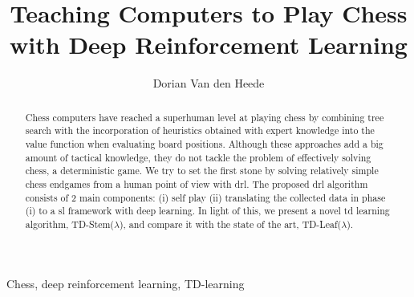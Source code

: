 \documentclass[twocolumn]{phdsymp} %
\begin{document}
\title{Teaching Computers to Play Chess with Deep Reinforcement Learning} %

\author{Dorian Van den Heede}


\maketitle

\begin{abstract}
Chess computers have reached a superhuman level at playing chess by combining tree search with the incorporation of heuristics obtained with expert knowledge into the value function when evaluating board positions. Although these approaches add a big amount of tactical knowledge, they do not tackle the problem of effectively solving chess, a deterministic game. We try to set the first stone by solving relatively simple chess endgames from a human point of view with \gls{drl}. The proposed \gls{drl} algorithm consists of 2 main components: (i) self play (ii) translating the collected data in phase (i) to a \gls{sl} framework with deep learning. In light of this, we present a novel \gls{td} learning algorithm, TD-Stem($\lambda$), and compare it with the state of the art, TD-Leaf($\lambda$).
\end{abstract}

\begin{keywords}
Chess, deep reinforcement learning, TD-learning
\end{keywords}
\end{document}
